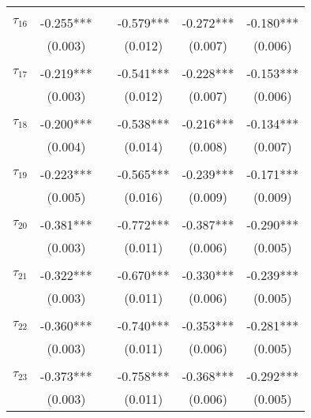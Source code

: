 \begin{tabular}{@{\extracolsep{-5pt}}lccccc}
                &           &&           &           &           \\[-2.1ex]
$\tau_{16}$     & -0.255*** && -0.579*** & -0.272*** & -0.180*** \\
                &  (0.003)  &&  (0.012)  &  (0.007)  &  (0.006)  \\
                &           &&           &           &           \\[-2.1ex]
$\tau_{17}$     & -0.219*** && -0.541*** & -0.228*** & -0.153*** \\
                &  (0.003)  &&  (0.012)  &  (0.007)  &  (0.006)  \\
                &           &&           &           &           \\[-2.1ex]
$\tau_{18}$     & -0.200*** && -0.538*** & -0.216*** & -0.134*** \\
                &  (0.004)  &&  (0.014)  &  (0.008)  &  (0.007)  \\
                &           &&           &           &           \\[-2.1ex]
$\tau_{19}$     & -0.223*** && -0.565*** & -0.239*** & -0.171*** \\
                &  (0.005)  &&  (0.016)  &  (0.009)  &  (0.009)  \\
                &           &&           &           &           \\[-2.1ex]
$\tau_{20}$     & -0.381*** && -0.772*** & -0.387*** & -0.290*** \\
                &  (0.003)  &&  (0.011)  &  (0.006)  &  (0.005)  \\
                &           &&           &           &           \\[-2.1ex]
$\tau_{21}$     & -0.322*** && -0.670*** & -0.330*** & -0.239*** \\
                &  (0.003)  &&  (0.011)  &  (0.006)  &  (0.005)  \\
                &           &&           &           &           \\[-2.1ex]
$\tau_{22}$     & -0.360*** && -0.740*** & -0.353*** & -0.281*** \\
                &  (0.003)  &&  (0.011)  &  (0.006)  &  (0.005)  \\
                &           &&           &           &           \\[-2.1ex]
$\tau_{23}$     & -0.373*** && -0.758*** & -0.368*** & -0.292*** \\
                &  (0.003)  &&  (0.011)  &  (0.006)  &  (0.005)  \\

\end{tabular}
